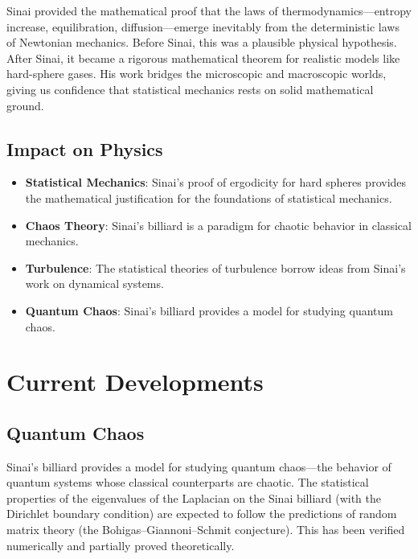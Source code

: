 \begin{whyitmatters}
Sinai provided the mathematical proof that the laws of thermodynamics---entropy increase, equilibration, diffusion---emerge inevitably from the deterministic laws of Newtonian mechanics. Before Sinai, this was a plausible physical hypothesis. After Sinai, it became a rigorous mathematical theorem for realistic models like hard-sphere gases. His work bridges the microscopic and macroscopic worlds, giving us confidence that statistical mechanics rests on solid mathematical ground.
\end{whyitmatters}

\subsection{Impact on Physics}

\begin{itemize}
\item \textbf{Statistical Mechanics}: Sinai's proof of ergodicity for hard spheres provides the mathematical justification for the foundations of statistical mechanics.
\item \textbf{Chaos Theory}: Sinai's billiard is a paradigm for chaotic behavior in classical mechanics.
\item \textbf{Turbulence}: The statistical theories of turbulence borrow ideas from Sinai's work on dynamical systems.
\item \textbf{Quantum Chaos}: Sinai's billiard provides a model for studying quantum chaos.
\end{itemize}

\section{Current Developments}

\subsection{Quantum Chaos}

Sinai's billiard provides a model for studying quantum chaos---the behavior of quantum systems whose classical counterparts are chaotic. The statistical properties of the eigenvalues of the Laplacian on the Sinai billiard (with the Dirichlet boundary condition) are expected to follow the predictions of random matrix theory (the Bohigas--Giannoni--Schmit conjecture). This has been verified numerically and partially proved theoretically.

